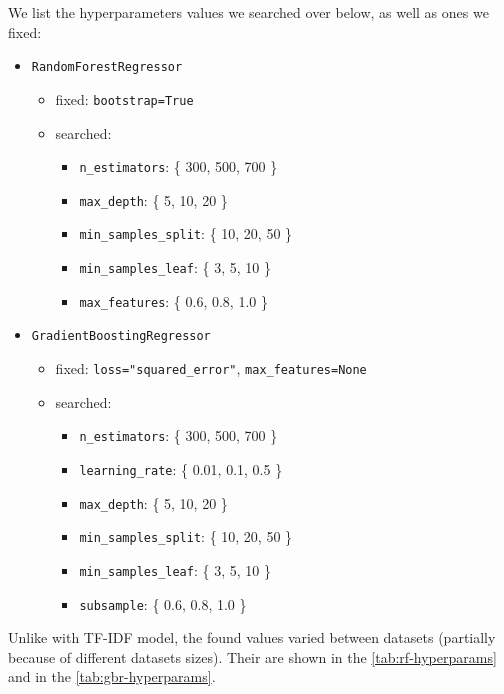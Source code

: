 \documentclass[runningheads]{llncs}
\begin{document}
We list the hyperparameters values we searched over below, as well as ones we fixed:

\begin{itemize}
    \item \texttt{RandomForestRegressor}
    \begin{itemize}
        \item fixed: \texttt{bootstrap=True}
        \item searched:
        \begin{itemize}
            \item \texttt{n\_estimators}: \{ 300, 500, 700 \}
            \item \texttt{max\_depth}: \{ 5, 10, 20 \}
            \item \texttt{min\_samples\_split}: \{ 10, 20, 50 \}
            \item \texttt{min\_samples\_leaf}: \{ 3, 5, 10 \}
            \item \texttt{max\_features}: \{ 0.6, 0.8, 1.0 \}
        \end{itemize}
    \end{itemize}

\vspace{10pt}

    \item \texttt{GradientBoostingRegressor}
    \begin{itemize}
        \item fixed: \texttt{loss="squared\_error"}, \texttt{max\_features=None}
        \item searched:
        \begin{itemize}
            \item \texttt{n\_estimators}: \{ 300, 500, 700 \}
            \item \texttt{learning\_rate}: \{ 0.01, 0.1, 0.5 \}
            \item \texttt{max\_depth}: \{ 5, 10, 20 \}
            \item \texttt{min\_samples\_split}: \{ 10, 20, 50 \}
            \item \texttt{min\_samples\_leaf}: \{ 3, 5, 10 \}
            \item \texttt{subsample}: \{ 0.6, 0.8, 1.0 \}
        \end{itemize}
    \end{itemize}
\end{itemize}

Unlike with TF-IDF model, the found values varied between datasets (partially because of different datasets sizes). Their are shown in the \cref{tab:rf-hyperparams} and in the \cref{tab:gbr-hyperparams}.
\end{document}
